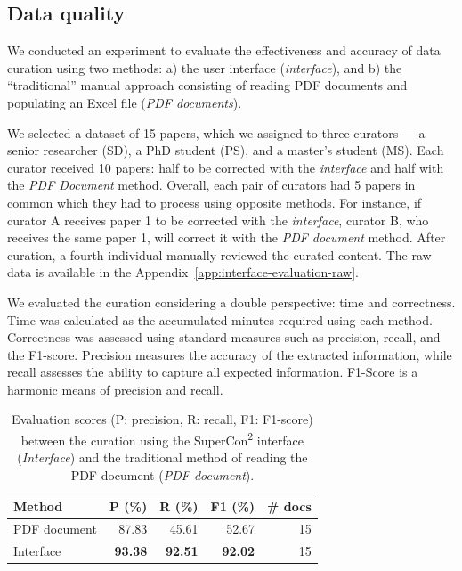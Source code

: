 \subsection{Data quality}
\label{sec:interface-evaluation}
We conducted an experiment to evaluate the effectiveness and accuracy of data curation using two methods: a) the user interface (\textit{interface}), and b) the ``traditional'' manual approach consisting of reading PDF documents and populating an Excel file (\textit{PDF documents}).

We selected a dataset of 15 papers, which we assigned to three curators — a senior researcher (SD), a PhD student (PS), and a master's student (MS). 
Each curator received 10 papers: half to be corrected with the \textit{interface} and half with the \textit{PDF Document} method. 
Overall, each pair of curators had 5 papers in common which they had to process using opposite methods.
For instance, if curator A receives paper 1 to be corrected with the \textit{interface}, curator B, who receives the same paper 1, will correct it with the \textit{PDF document} method.
After curation, a fourth individual manually reviewed the curated content. The raw data is available in the Appendix~\ref{app:interface-evaluation-raw}.

We evaluated the curation considering a double perspective: time and correctness. 
Time was calculated as the accumulated minutes required using each method. 
Correctness was assessed using standard measures such as precision, recall, and the F1-score.
Precision measures the accuracy of the extracted information, while recall assesses the ability to capture all expected information. F1-Score is a harmonic means of precision and recall. 

\begin{table}[ht]
\centering\small
\caption{Evaluation scores (P: precision, R: recall, F1: F1-score) between the curation using the SuperCon\textsuperscript{2} interface (\textit{Interface}) and the traditional method of reading the PDF document (\textit{PDF document}). }
\begin{tabular}{lrrrr}
\toprule
    \textbf{Method}    & \textbf{P (\%)}   & \textbf{R (\%)}   & \textbf{F1 (\%)}  & \textbf{\# docs}   \\
    \midrule
    PDF document    & 87.83             & 45.61             & 52.67             & 15        \\
    Interface       & \textbf{93.38}    & \textbf{92.51}    & \textbf{92.02}    & 15        \\
    \bottomrule
\end{tabular}
\label{tab:evaluation-interface-correction}
\end{table}


